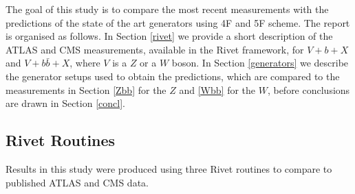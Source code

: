 \documentclass[11pt]{cernrep}
\begin{document}
The goal of this study is to compare the most recent measurements with the
predictions of the state of the art generators using 4F and 5F scheme. The
report is organised as follows. In Section \ref{rivet} we provide a short
description of the ATLAS and CMS measurements, available in the Rivet
framework, for $V+b+X$ and $V+b\bar{b}+X$, where $V$ is a $Z$ or a $W$ boson.
In Section \ref{generators} we describe the generator setups used to obtain
the predictions, which are compared to the measurements in Section \ref{Zbb}
for the $Z$ and \ref{Wbb} for the $W$, before conclusions are drawn in
Section \ref{concl}.


\subsection{Rivet Routines \label{rivet}}

Results in this study were produced using three Rivet routines to compare to
published ATLAS and CMS data.
\end{document}
